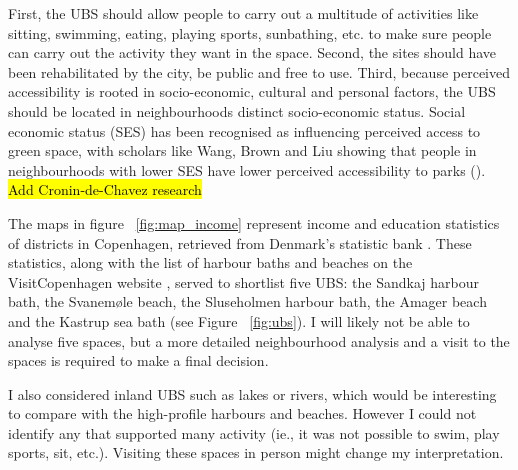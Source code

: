 \documentclass{article}
\begin{document}
First, the UBS should allow people to carry out a multitude of activities like sitting, swimming, eating, playing sports, sunbathing, etc. to make sure people can carry out the activity they want in the space.
Second, the sites should have been rehabilitated by the city, be public and free to use.
Third, because perceived accessibility is rooted in socio-economic, cultural and personal factors, the UBS should be located in neighbourhoods distinct socio-economic status. Social economic status (SES) has been recognised as influencing perceived access to green space, with scholars like Wang, Brown and Liu showing that people in neighbourhoods with lower SES have lower perceived accessibility to parks (\citeyear{wang2015physical}). \hl{Add Cronin-de-Chavez research}

The maps in figure ~\ref{fig:map_income} represent income and education statistics of districts in Copenhagen, retrieved from Denmark's statistic bank \parencite{copenhagenStatbank}. These statistics, along with the list of harbour baths and beaches on the VisitCopenhagen website \parencite{visitcopenhagen_baths}, served to shortlist five UBS: the Sandkaj harbour bath, the Svanemøle beach, the Sluseholmen harbour bath, the Amager beach and the Kastrup sea bath (see Figure ~\ref{fig:ubs}). I will likely not be able to analyse five spaces, but a more detailed neighbourhood analysis and a visit to the spaces is required to make a final decision. 

I also considered inland UBS such as lakes or rivers, which would be interesting to compare with the high-profile harbours and beaches. However I could not identify any that supported many activity (ie., it was not possible to swim, play sports, sit, etc.). Visiting these spaces in person might change my interpretation.
\end{document}
